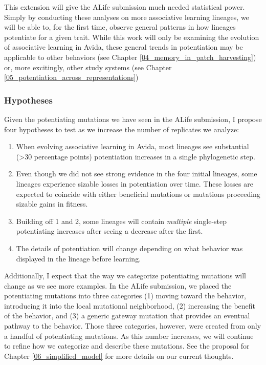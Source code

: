 This extension will give the ALife submission much needed statistical power.
Simply by conducting these analyses on more associative learning lineages, we will be able to, for the first time, observe general patterns in how lineages potentiate for a given trait.
While this work will only be examining the evolution of associative learning in Avida, these general trends in potentiation may be applicable to other behaviors (see Chapter \ref{04_memory_in_patch_harvesting}) or, more excitingly, other study systems (see Chapter \ref{05_potentiation_across_representations}) 

\subsubsection{Hypotheses}

Given the potentiating mutations we have seen in the ALife submission, I propose four hypotheses to test as we increase the number of replicates we analyze: 

\begin{enumerate}
    \item When evolving associative learning in Avida, most lineages see substantial (>30 percentage points) potentiation increases in a single phylogenetic step.
    \item Even though we did not see strong evidence in the four initial lineages, some lineages experience sizable losses in potentiation over time. These losses are expected to coincide with either beneficial mutations or mutations proceeding sizable gains in fitness.
    \item Building off 1 and 2, some lineages will contain \textit{multiple} single-step potentiating increases after seeing a decrease after the first.  
    \item The details of potentiation will change depending on what behavior was displayed in the lineage before learning.
\end{enumerate}

Additionally, I expect that the way we categorize potentiating mutations will change as we see more examples. 
In the ALife submission, we placed the potentiating mutations into three categories (1) moving toward the behavior, introducing it into the local mutational neighborhood, (2) increasing the benefit of the behavior, and (3) a generic gateway mutation that provides an eventual pathway to the behavior. 
Those three categories, however, were created from only a  handful of potentiating mutations. 
As this number increases, we will continue to refine how we categorize and describe these mutations. 
See the proposal for Chapter \ref{06_simplified_model} for more details on our current thoughts. 

